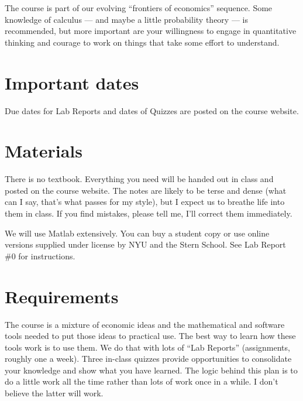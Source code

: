 \documentclass[11pt]{article}
\begin{document}
The course is part of our evolving ``frontiers of economics''
sequence.
Some knowledge of calculus --- and maybe a little probability theory --- is recommended,
but more important are your willingness to engage in quantitative thinking
and courage to work on things that take some effort to understand.


\section*{Important dates}

Due dates for Lab Reports and dates of Quizzes are posted on the course website.

\section*{Materials}

There is no textbook.  Everything you need will be
handed out in class and posted on the course website.
The notes are likely to be terse and dense
(what can I say, that's what passes for my style),
but I expect us to breathe life into them in class.
If you find mistakes, please tell me, I'll correct them immediately.


We will use Matlab extensively.  You can buy a student copy
or use online versions supplied under license by NYU and the Stern School.
See Lab Report \#0 for instructions.


\section*{Requirements}

The course is a mixture of economic ideas and
the mathematical and software tools needed to put those ideas to practical use.
The best way to learn how these tools work is to use them.
We do that with lots of ``Lab Reports'' (assignments, roughly one a week).
Three in-class quizzes provide opportunities to consolidate your knowledge
and show what you have learned.
The logic behind this plan is to do a little work all the time rather than lots of
work once in a while.
I don't believe the latter will work.
\end{document}
